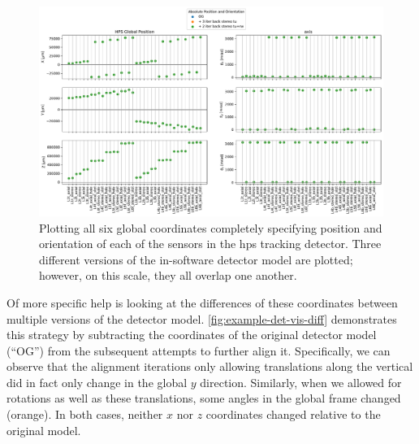 \begin{figure}
	\centering
	\includegraphics[width=\textwidth]{figures/hps/alignment/example-det-vis-abs.pdf}
	\caption{Plotting all six global coordinates completely specifying position and orientation
	of each of the sensors in the \ac{hps} tracking detector. Three different versions of the
	in-software detector model are plotted; however, on this scale, they all overlap one another.}
	\label{fig:example-det-vis-abs}
\end{figure}

Of more specific help is looking at the differences of these coordinates between
multiple versions of the detector model. \cref{fig:example-det-vis-diff} demonstrates
this strategy by subtracting the coordinates of the original detector model (``OG'')
from the subsequent attempts to further align it. Specifically, we can observe that
the alignment iterations only allowing translations along the vertical did in fact
only change in the global $y$ direction. Similarly, when we allowed for rotations as
well as these translations, some angles in the global frame changed (orange).
In both cases, neither $x$ nor $z$ coordinates changed relative to the original model.

